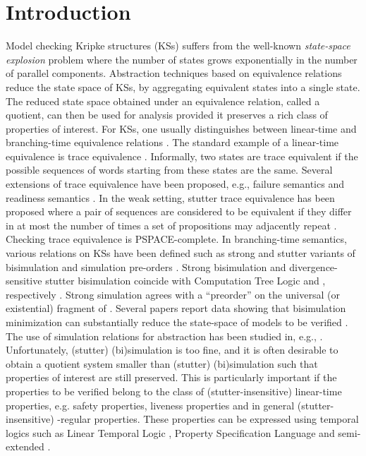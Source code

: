 \documentclass{llncs}
\newcommand{\<}{\langle}
\renewcommand{\>}{\rangle}
\begin{document}
\section{Introduction}
Model checking Kripke structures (KSs) \cite{KB08} suffers from the well-known \emph{state-space explosion} problem where the number of states grows exponentially in the number of parallel components. Abstraction techniques based on equivalence relations reduce the state space of KSs, by aggregating equivalent states into a single state. The reduced state space obtained under an equivalence relation, called a quotient, can then be used for analysis provided it preserves a rich class of properties of interest. For KSs, one usually distinguishes between linear-time and branching-time equivalence relations \cite{RJG01}. The standard example of a linear-time equivalence is trace equivalence \cite{Hoare78,Rem87,JLA85}. Informally, two states are trace equivalent if the possible sequences of words starting from these states are the same. Several extensions of trace equivalence have been proposed, e.g., failure semantics and readiness semantics \cite{CSAR84,CAR85,RDNMH84,Nicola87,CH86,APnueli85,BBWK87,LPomello85,VeglioniN98}. In the weak setting, stutter trace equivalence has been proposed where a pair of sequences are considered to be equivalent if they differ in at most the number of times a set of propositions may adjacently repeat \cite{LLamport83}. Checking trace equivalence is PSPACE-complete. In branching-time semantics, various relations on KSs have been defined such as strong and stutter variants of bisimulation and simulation pre-orders \cite{MilnerR80,DPark81,Milner71,JFGrooteV90,EBrowneCG88,WPWGlabbeekW96}. Strong bisimulation and divergence-sensitive stutter bisimulation coincide with Computation Tree Logic  and , respectively \cite{EBrowneCG88,FWVNicolaV90a}. Strong simulation agrees with a “preorder” on the universal (or existential) fragment of  \cite{ODClarkeGL94}. Several papers report data showing that bisimulation minimization can substantially reduce the state-space of models to be verified \cite{AVSRKB94,KFMYV98}. The use of simulation relations for abstraction has been studied in, e.g., \cite{ODClarkeGL94,PCousotC02,LoiseauxGSBB95}. Unfortunately, (stutter) (bi)simulation is too fine, and it is often desirable to obtain a quotient system smaller than (stutter) (bi)simulation such that properties of interest are still preserved. This is particularly important if the properties to be verified belong to the class of (stutter-insensitive) linear-time properties, e.g. safety properties, liveness properties and in general (stutter-insensitive) -regular properties. These properties can be expressed using temporal logics such as Linear Temporal Logic  \cite{KB08}, Property Specification Language  \cite{IEEE05} and  semi-extended   \cite{DaxKL09}.   
\end{document}
